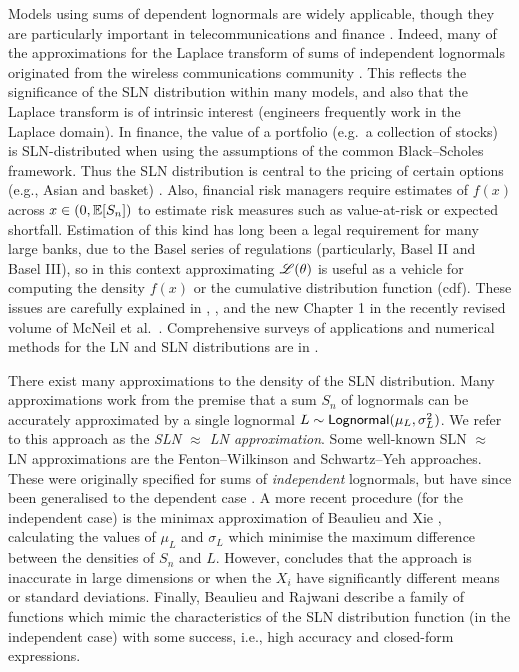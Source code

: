 Models using sums of dependent lognormals are widely applicable, though they
are particularly important in telecommunications and finance
\cite{dufresne2004log,dufresne2008}. Indeed, many of the approximations
for the Laplace transform of sums of independent lognormals originated from
the wireless communications community \cite{beaulieu1995estimating}. This
reflects the significance of the SLN distribution within many models, and also
that the Laplace transform is of intrinsic interest (engineers frequently work
in the Laplace domain). In finance, the value of a portfolio (e.g.\ a
collection of stocks) is SLN-distributed when using the assumptions of the
common Black--Scholes framework. Thus the SLN distribution is central to the
pricing of certain options (e.g., Asian and basket)
\cite{milevsky1998asian}. Also, financial risk managers require estimates of
$f(x)$ across $x \in (0, \operatorname{{\mathbb E}}[S_n])$ to estimate risk measures such as
value-at-risk or expected shortfall.  Estimation of this kind has long been a
legal requirement for many large banks, due to the Basel series of regulations
(particularly, Basel II and Basel III), so in this context approximating
$\mathscr{L}(\theta)$ is useful as a vehicle for computing the density $f(x)$ or
the cumulative distribution function (cdf). These issues are carefully explained in
\cite{duellmann2010regulatory}, \cite{embrechts2014academic}, and the new
Chapter 1 in the recently revised volume of McNeil et
al.\ \cite{mcneil2015quantitative}. Comprehensive surveys of applications and
numerical methods for the LN and SLN distributions are in
\cite{tankov2015tail,asmussen2014laplace,asmussen2015exponential}.

There exist many approximations to the density of the SLN distribution. Many
approximations work from the premise \cite{beaulieu2004highly} that a sum
$S_n$ of lognormals can be accurately approximated by a single lognormal
$L\sim \mathsf{Lognormal}(\mu_L, \sigma_L^2)$. We refer to this approach as the
\emph{SLN $\approx$ LN approximation}. Some well-known SLN $\approx$ LN
approximations are the Fenton--Wilkinson \cite{fenton1960sum} and
Schwartz--Yeh \cite{schwartz1982distribution} approaches. These were
originally specified for sums of \emph{independent} lognormals, but have since
been generalised to the dependent case \cite{abu1994outage}. A more recent
procedure (for the independent case) is the minimax approximation of Beaulieu
and Xie \cite{beaulieu2004optimal}, calculating the values of $\mu_L$ and
$\sigma_L$ which minimise the maximum difference between the densities of
$S_n$ and $L$.  However, \cite{beaulieu2004optimal} concludes that the
approach is inaccurate in large dimensions or when the $X_i$ have
significantly different means or standard deviations. Finally, Beaulieu and
Rajwani \cite{beaulieu2004highly} describe a family of functions which mimic
the characteristics of the SLN distribution function (in the independent case)
with some success, i.e., high accuracy and closed-form expressions.

